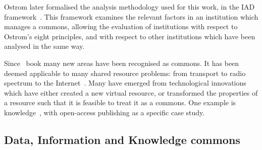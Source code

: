Ostrom later formalised the analysis methodology used for this work, in the \ac{IAD} framework~\citep{Ostrom2005}. 
This framework examines the relevant factors in an institution which manages a commons, allowing the evaluation of institutions with respect to Ostrom's eight principles, and with respect to other institutions which have been analysed in the same way.

Since~ book many new areas have been recognised as commons. It has been deemed applicable to many shared resource problems: from transport to radio spectrum to the Internet~\citep{Hess2000}. 
Many have emerged from technological innovations which have either created a new virtual resource, or transformed the properties of a resource such that it is feasible to treat it as a commons. One example is knowledge~\citep{Hess2007}, with open-access publishing as a specific case study. 



\subsection{Data, Information and Knowledge commons}

